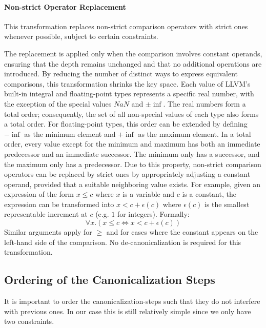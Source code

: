 	\paragraph{Non-strict Operator Replacement}
	This transformation replaces non-strict comparison operators with strict ones whenever possible, subject to certain constraints.

	The replacement is applied only when the comparison involves constant operands, ensuring that the depth remains unchanged and that no additional operations are introduced.
	By reducing the number of distinct ways to express equivalent comparisons, this transformation shrinks the key space.
	Each value of LLVM's built-in integral and floating-point types represents a specific real number, with the exception of the special values $NaN$ and $\pm \inf$.
	The real numbers form a total order; consequently, the set of all non-special values of each type also forms a total order.
	For floating-point types, this order can be extended by defining $- \inf$ as the minimum element and $+ \inf$ as the maximum element.
	In a total order, every value except for the minimum and maximum has both an immediate predecessor and an immediate successor.
	The minimum only has a successor, and the maximum only has a predecessor.
	Due to this property, non-strict comparison operators can be replaced by strict ones by appropriately adjusting a constant operand, provided that a suitable neighboring value exists.
	For example, given an expression of the form $x \leq c$ where $x$ is a variable and $c$ is a constant, the expression can be transformed into $x < c + \epsilon(c)$ where $\epsilon(c)$ is the smallest representable increment at $c$ (e.g. $1$ for integers).
	Formally:
	\[
		\forall x . (x \leq c \iff x < c + \epsilon(c))
	\]
	Similar arguments apply for $\geq$ and for cases where the constant appears on the left-hand side of the comparison.
	No de-canonicalization is required for this transformation.

	\subsection{Ordering of the Canonicalization Steps \label{sec:ordering}}

	It is important to order the canonicalization-steps such that they do not interfere with previous ones.
	In our case this is still relatively simple since we only have two constraints.

